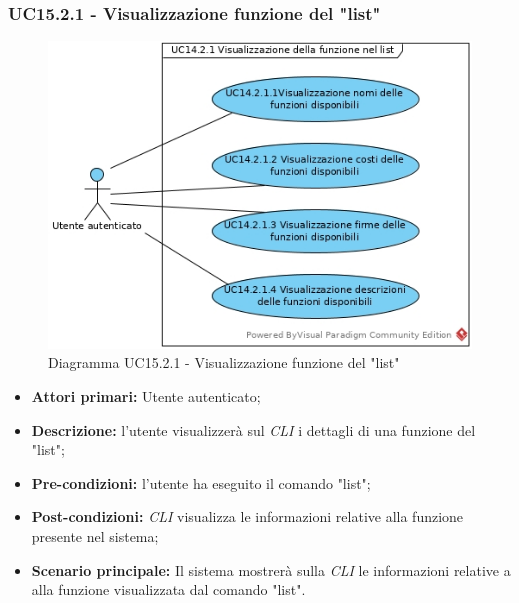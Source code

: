 \subsubsection{UC15.2.1 - Visualizzazione funzione del "list"}
\begin{figure}[h]
	\centering
	\includegraphics[width=0.7\linewidth]{res/img/UC14.2.1.jpg}
	\caption{Diagramma UC15.2.1 - Visualizzazione funzione del "list"}
\end{figure}
\begin{itemize}
	\item \textbf{Attori primari:} Utente autenticato;
	\item \textbf{Descrizione:} l'utente visualizzerà sul \textit{CLI\glo} i dettagli di una funzione del "list";
	\item \textbf{Pre-condizioni:} l'utente ha eseguito il comando "list";
	\item \textbf{Post-condizioni:} \textit{CLI\glo} visualizza le informazioni relative alla funzione presente nel sistema;
	\item \textbf{Scenario principale:} Il sistema mostrerà sulla \textit{CLI\glo} le informazioni relative a alla funzione visualizzata dal comando "list".
\end{itemize}
